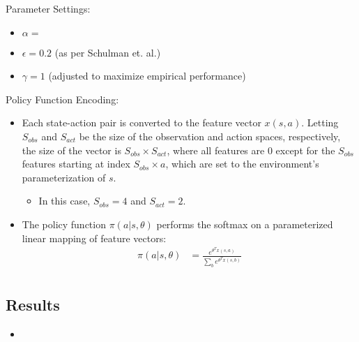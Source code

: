 \documentclass[a4paper]{article}
\begin{document}
Parameter Settings:
\begin{itemize}
    \item $\alpha = $ %
    \item $\epsilon = 0.2$ (as per Schulman et. al.)
    \item $\gamma = 1$ (adjusted to maximize empirical performance)
\end{itemize}
Policy Function Encoding:
\begin{itemize}
    \item Each state-action pair is converted to the feature vector $x(s, a)$.
        Letting $S_{obs}$ and $S_{act}$ be the size of the observation and
        action spaces, respectively, the size of the vector is $S_{obs} \times
        S_{act}$, where all features are $0$ except for the $S_{obs}$ features
        starting at index $S_{obs} \times a$, which are set to the
        environment's parameterization of $s$.
    \begin{itemize}
        \item In this case, $S_{obs} = 4$ and $S_{act} = 2$.
    \end{itemize}
    \item The policy function $\pi(a | s, \theta)$ performs the softmax on a
        parameterized linear mapping of feature vectors:
        \begin{align*}
            \pi(a | s, \theta) &= \frac{e^{\theta^T x(s, a)}}
            {\sum_{b} e^{\theta^T x(s, b)}}\\
        \end{align*}
\end{itemize}
\subsection*{Results}
\begin{centering}
\end{centering}
\begin{itemize}
    \item 
\end{itemize}
\end{document}
